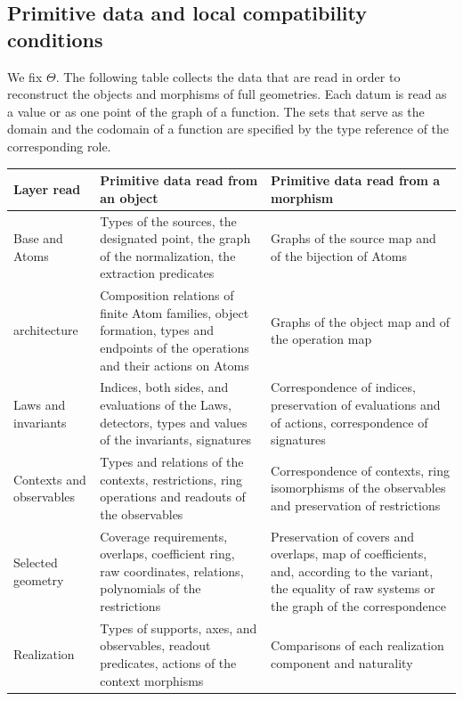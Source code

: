 \subsection*{Primitive data and local compatibility conditions}

\begin{definition}\label{def:8.15}

We fix $\Theta$.
The following table collects the data that are read in order to reconstruct the objects and
morphisms of full geometries.
Each datum is read as a value or as one point of the graph of a function.
The sets that serve as the domain and the codomain of a function are specified by the type
reference of the corresponding role.

\begin{xltabular}{\linewidth}{@{}LLL@{}}
\toprule
Layer read & Primitive data read from an object & Primitive data read from a morphism \\
\midrule
\endhead
Base and Atoms & Types of the sources, the designated point, the graph of the normalization, the extraction predicates & Graphs of the source map and of the bijection of Atoms \\
\addlinespace[3pt]
architecture & Composition relations of finite Atom families, object formation, types and endpoints of the operations and their actions on Atoms & Graphs of the object map and of the operation map \\
\addlinespace[3pt]
Laws and invariants & Indices, both sides, and evaluations of the Laws, detectors, types and values of the invariants, signatures & Correspondence of indices, preservation of evaluations and of actions, correspondence of signatures \\
\addlinespace[3pt]
Contexts and observables & Types and relations of the contexts, restrictions, ring operations and readouts of the observables & Correspondence of contexts, ring isomorphisms of the observables and preservation of restrictions \\
\addlinespace[3pt]
Selected geometry & Coverage requirements, overlaps, coefficient ring, raw coordinates, relations, polynomials of the restrictions & Preservation of covers and overlaps, map of coefficients, and, according to the variant, the equality of raw systems or the graph of the correspondence \\
\addlinespace[3pt]
Realization & Types of supports, axes, and observables, readout predicates, actions of the context morphisms & Comparisons of each realization component and naturality \\
\bottomrule
\end{xltabular}


\end{definition}
